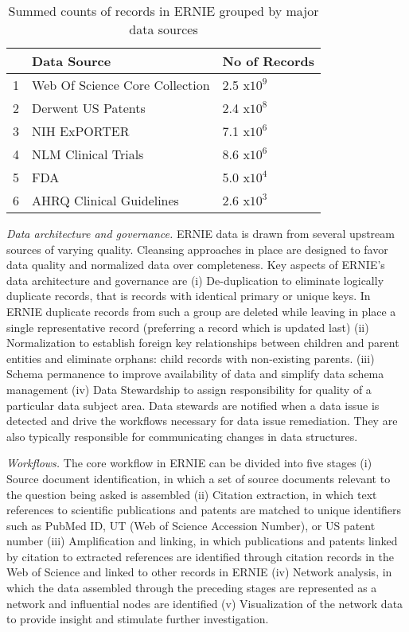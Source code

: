 \documentclass[review]{elsarticle}
\begin{document}
\begin{table}[ht]
\begin{tabular}{rll}
  \hline
 & Data Source & No of Records \\ 
  \hline
1 & Web Of Science Core Collection & 2.5 x$10^{9}$\\ 
  2 & Derwent US Patents & 2.4 x$10^{8}$\\
  3 & NIH ExPORTER & 7.1 x$10^{6}$ \\ 
  4 & NLM Clinical Trials & 8.6 x$10^{6}$ \\ 
  5 &  FDA & 5.0 x$10^{4}$\\  
  6 & AHRQ Clinical Guidelines & 2.6 x$10^{3}$ \\ 
   \hline
\end{tabular}
\caption {Summed counts of records in ERNIE grouped by major data sources}
\end{table}

\emph{Data architecture and governance.} ERNIE data is drawn from several upstream sources of varying quality. Cleansing approaches in place are designed to favor data quality and normalized data over completeness. Key aspects of ERNIE's data architecture and governance are (i) De-duplication to eliminate logically duplicate records, that is records with identical primary or unique keys. In ERNIE duplicate records from such a group are deleted while leaving in place a single representative record (preferring a record which is updated last) (ii) Normalization to establish foreign key relationships between children and parent entities and eliminate orphans: child records with non-existing parents. (iii) Schema permanence to improve availability of data and simplify data schema management (iv) Data Stewardship to assign responsibility for quality of a particular data subject area. Data stewards are notified when a data issue is detected and drive the workflows necessary for data issue remediation. They are also typically responsible for communicating changes in data structures.

\emph{Workflows.} The core workflow in ERNIE can be divided into five stages (i) Source document identification, in which a set of source documents relevant to the question being asked is assembled  (ii) Citation extraction, in which text references to scientific publications and patents are matched to unique identifiers such as PubMed ID, UT (Web of Science Accession Number), or US patent number (iii) Amplification and linking, in which publications and patents linked by citation to extracted references are identified through citation records in the Web of Science and linked to other records in ERNIE (iv) Network analysis, in which the data assembled through the preceding stages are represented as a network and influential nodes are identified (v) Visualization of the network data to provide insight and stimulate further investigation.
\end{document}

